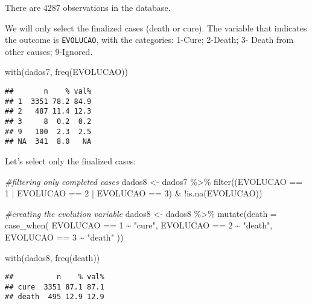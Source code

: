 \documentclass[
]{article}
\newenvironment{Shaded}{\begin{snugshade}}{\end{snugshade}}
\newcommand{\AttributeTok}[1]{\textcolor[rgb]{0.77,0.63,0.00}{#1}}
\newcommand{\CommentTok}[1]{\textcolor[rgb]{0.56,0.35,0.01}{\textit{#1}}}
\newcommand{\DecValTok}[1]{\textcolor[rgb]{0.00,0.00,0.81}{#1}}
\newcommand{\FunctionTok}[1]{\textcolor[rgb]{0.00,0.00,0.00}{#1}}
\newcommand{\NormalTok}[1]{#1}
\newcommand{\OtherTok}[1]{\textcolor[rgb]{0.56,0.35,0.01}{#1}}
\newcommand{\SpecialCharTok}[1]{\textcolor[rgb]{0.00,0.00,0.00}{#1}}
\newcommand{\StringTok}[1]{\textcolor[rgb]{0.31,0.60,0.02}{#1}}
\begin{document}
There are 4287 observations in the database.

We will only select the finalized cases (death or cure). The variable
that indicates the outcome is \texttt{EVOLUCAO}, with the categories:
1-Cure; 2-Death; 3- Death from other causes; 9-Ignored.

\begin{Shaded}
\begin{Highlighting}[]
\FunctionTok{with}\NormalTok{(dados7, }\FunctionTok{freq}\NormalTok{(EVOLUCAO))}
\end{Highlighting}
\end{Shaded}

\begin{verbatim}
##       n    % val%
## 1  3351 78.2 84.9
## 2   487 11.4 12.3
## 3     8  0.2  0.2
## 9   100  2.3  2.5
## NA  341  8.0   NA
\end{verbatim}

Let's select only the finalized cases:

\begin{Shaded}
\begin{Highlighting}[]
\CommentTok{\#filtering only completed cases}
\NormalTok{dados8 }\OtherTok{\textless{}{-}}\NormalTok{ dados7 }\SpecialCharTok{\%\textgreater{}\%} 
  \FunctionTok{filter}\NormalTok{((EVOLUCAO }\SpecialCharTok{==} \DecValTok{1} \SpecialCharTok{|}\NormalTok{ EVOLUCAO }\SpecialCharTok{==} \DecValTok{2} \SpecialCharTok{|}\NormalTok{ EVOLUCAO }\SpecialCharTok{==} \DecValTok{3}\NormalTok{) }\SpecialCharTok{\&} \SpecialCharTok{!}\FunctionTok{is.na}\NormalTok{(EVOLUCAO))}


\CommentTok{\#creating the evolution variable}
\NormalTok{dados8 }\OtherTok{\textless{}{-}}\NormalTok{ dados8 }\SpecialCharTok{\%\textgreater{}\%} 
  \FunctionTok{mutate}\NormalTok{(}\AttributeTok{death =} \FunctionTok{case\_when}\NormalTok{(}
\NormalTok{    EVOLUCAO }\SpecialCharTok{==} \DecValTok{1} \SpecialCharTok{\textasciitilde{}} \StringTok{"cure"}\NormalTok{, }
\NormalTok{    EVOLUCAO }\SpecialCharTok{==} \DecValTok{2} \SpecialCharTok{\textasciitilde{}} \StringTok{"death"}\NormalTok{,}
\NormalTok{    EVOLUCAO }\SpecialCharTok{==} \DecValTok{3} \SpecialCharTok{\textasciitilde{}} \StringTok{"death"}
\NormalTok{  ))}

\FunctionTok{with}\NormalTok{(dados8, }\FunctionTok{freq}\NormalTok{(death))}
\end{Highlighting}
\end{Shaded}

\begin{verbatim}
##          n    % val%
## cure  3351 87.1 87.1
## death  495 12.9 12.9
\end{verbatim}
\end{document}
